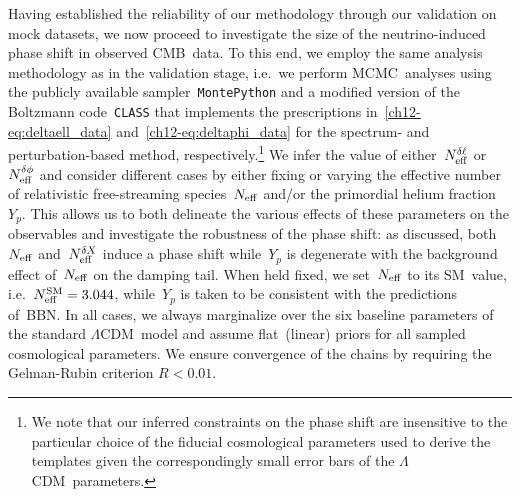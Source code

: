 Having established the reliability of our methodology through our validation on mock datasets, we now proceed to investigate the size of the neutrino-induced phase shift in observed CMB~data. To this end, we employ the same analysis methodology as in the validation stage, i.e.\ we perform MCMC~analyses using the publicly available sampler~\texttt{MontePython} and a modified version of the Boltzmann code~\texttt{CLASS} that implements the prescriptions in~\eqref{ch12-eq:deltaell_data} and~\eqref{ch12-eq:deltaphi_data} for the spectrum- and perturbation-based method, respectively.\footnote{We note that our inferred constraints on the phase shift are insensitive to the particular choice of the fiducial cosmological parameters used to derive the templates given the correspondingly small error bars of the $\Lambda$CDM~parameters.} We infer the value of either~$N_\mathrm{eff}^{\delta\ell}$ or~$N_\mathrm{eff}^{\delta\phi}$ and consider different cases by either fixing or varying the effective number of relativistic free-streaming species~$N_\mathrm{eff}$ and/or the primordial helium fraction~$Y_p$. This allows us to both delineate the various effects of these parameters on the observables and investigate the robustness of the phase shift: as discussed, both~$N_\mathrm{eff}$ and~$N_\mathrm{eff}^{\delta X}$ induce a phase shift while~$Y_p$ is degenerate with the background effect of~$N_\mathrm{eff}$ on the damping tail. When held fixed, we set~$N_\mathrm{eff}$ to its SM~value, i.e.~$N_\mathrm{eff}^\mathrm{SM} = 3.044$, while~$Y_p$ is taken to be consistent with the predictions of~BBN. In all cases, we always marginalize over the six baseline parameters of the standard $\Lambda$CDM~model and assume flat~(linear) priors for all sampled cosmological parameters. We ensure convergence of the chains by requiring the Gelman-Rubin criterion $R < 0.01$.\medskip

